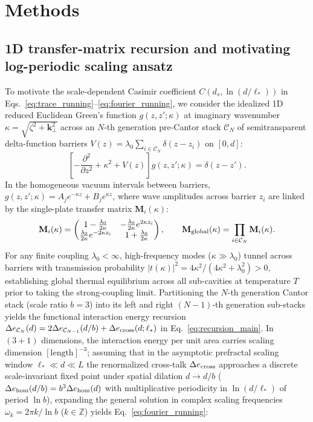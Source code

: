\documentclass[pdflatex,sn-nature]{sn-jnl}
\begin{document}
\section*{Methods}
\label{sec:methods}

\subsection*{1D transfer-matrix recursion and motivating log-periodic scaling ansatz}
To motivate the scale-dependent Casimir coefficient $C(d_s, \ln(d/\ell_*))$ in Eqs.~\eqref{eq:trace_running}--\eqref{eq:fourier_running}\cite{gordon2026prd}, we consider the idealized 1D reduced Euclidean Green's function $g(z, z'; \kappa)$ at imaginary wavenumber $\kappa = \sqrt{\zeta^2 + \mathbf{k}_\perp^2}$ across an $N$-th generation pre-Cantor stack $\mathcal{C}_N$ of semitransparent delta-function barriers $V(z) = \lambda_0 \sum_{i \in \mathcal{C}_N} \delta(z - z_i)$ on $[0, d]$:
\begin{equation}
\left[ -\frac{\partial^2}{\partial z^2} + \kappa^2 + V(z) \right] g(z, z'; \kappa) = \delta(z - z').
\end{equation}
In the homogeneous vacuum intervals between barriers, $g(z, z'; \kappa) = A_j e^{-\kappa z} + B_j e^{\kappa z}$, where wave amplitudes across barrier $z_i$ are linked by the single-plate transfer matrix $\mathbf{M}_i(\kappa)$:
\begin{equation}
\mathbf{M}_i(\kappa) = \begin{pmatrix} 1 - \frac{\lambda_0}{2\kappa} & -\frac{\lambda_0}{2\kappa} e^{2\kappa z_i} \\ \frac{\lambda_0}{2\kappa} e^{-2\kappa z_i} & 1 + \frac{\lambda_0}{2\kappa} \end{pmatrix}, \qquad \mathbf{M}_{\rm global}(\kappa) = \prod_{i \in \mathcal{C}_N} \mathbf{M}_i(\kappa).
\end{equation}
For any finite coupling $\lambda_0 < \infty$, high-frequency modes ($\kappa \gg \lambda_0$) tunnel across barriers with transmission probability $|t(\kappa)|^2 = 4\kappa^2 / (4\kappa^{2} + \lambda_0^2) > 0$, establishing global thermal equilibrium across all sub-cavities at temperature $T$ prior to taking the strong-coupling limit\cite{gordon2026prd}. Partitioning the $N$-th generation Cantor stack (scale ratio $b=3$) into its left and right $(N-1)$-th generation sub-stacks yields the functional interaction energy recursion $\Delta e_{\mathcal{C}_N}(d) = 2\Delta e_{\mathcal{C}_{N-1}}(d/b) + \Delta e_{\rm cross}(d; \ell_*)$ in Eq.~\eqref{eq:recursion_main}. In $(3+1)$ dimensions, the interaction energy per unit area carries scaling dimension $[\text{length}]^{-3}$; assuming that in the asymptotic prefractal scaling window $\ell_* \ll d \ll L$ the renormalized cross-talk $\Delta e_{\rm cross}$ approaches a discrete scale-invariant fixed point under spatial dilation $d \to d/b$ ($\Delta e_{\rm hom}(d/b) = b^3 \Delta e_{\rm hom}(d)$ with multiplicative periodicity in $\ln(d/\ell_*)$ of period $\ln b$), expanding the general solution in complex scaling frequencies $\omega_k = 2\pi k / \ln b$ ($k \in \mathbb{Z}$) yields Eq.~\eqref{eq:fourier_running}:
\end{document}
